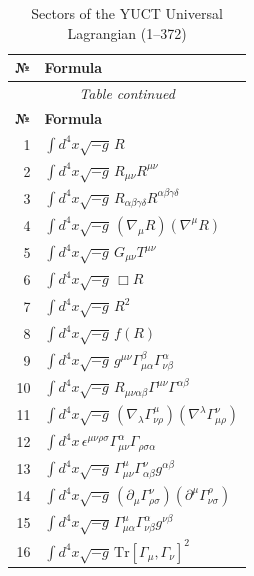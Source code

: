 \documentclass[11pt,a4paper]{article}
\begin{document}
	\scriptsize
\begin{longtable}{r p{}}
	\caption{Sectors of the YUCT Universal Lagrangian (1–372)}\label{tab:sectors-100}\\
	\toprule
	\textbf{№} & \textbf{Formula} \\
	\midrule
	\endfirsthead
	\multicolumn{2}{c}{\textit{Table continued}}\\
	\toprule
	\textbf{№} & \textbf{Formula} \\
	\midrule
	\endhead
	\bottomrule
	\endfoot
	1 & \(\displaystyle \int d^4x\sqrt{-g}\,R\) \\
	2 & \(\displaystyle \int d^4x\sqrt{-g}\,R_{\mu\nu}R^{\mu\nu}\) \\
	3 & \(\displaystyle \int d^4x\sqrt{-g}\,R_{\alpha\beta\gamma\delta}R^{\alpha\beta\gamma\delta}\) \\
	4 & \(\displaystyle \int d^4x\sqrt{-g}\,(\nabla_\mu R)(\nabla^\mu R)\) \\
	5 & \(\displaystyle \int d^4x\sqrt{-g}\,G_{\mu\nu}T^{\mu\nu}\) \\
	6 & \(\displaystyle \int d^4x\sqrt{-g}\,\Box R\) \\
	7 & \(\displaystyle \int d^4x\sqrt{-g}\,R^2\) \\
	8 & \(\displaystyle \int d^4x\sqrt{-g}\,f(R)\) \\
	9 & \(\displaystyle \int d^4x\sqrt{-g}\,g^{\mu\nu}\Gamma^{\beta}_{\mu\alpha}\Gamma^{\alpha}_{\nu\beta}\) \\
	10 & \(\displaystyle \int d^4x\sqrt{-g}\,R_{\mu\nu\alpha\beta}\Gamma^{\mu\nu}\Gamma^{\alpha\beta}\) \\
	11 & \(\displaystyle \int d^4x\sqrt{-g}\,(\nabla_\lambda\Gamma^{\mu}_{\nu\rho})(\nabla^\lambda\Gamma^{\nu}_{\mu\rho})\) \\
	12 & \(\displaystyle \int d^4x\,\epsilon^{\mu\nu\rho\sigma}\Gamma^{\alpha}_{\mu\nu}\Gamma_{\rho\sigma\alpha}\) \\
	13 & \(\displaystyle \int d^4x\sqrt{-g}\,\Gamma^{\mu}_{\mu\nu}\Gamma^{\nu}_{\alpha\beta}g^{\alpha\beta}\) \\
	14 & \(\displaystyle \int d^4x\sqrt{-g}\,(\partial_\mu\Gamma^{\nu}_{\rho\sigma})(\partial^\mu\Gamma^{\rho}_{\nu\sigma})\) \\
	15 & \(\displaystyle \int d^4x\sqrt{-g}\,\Gamma^{\mu}_{\mu\alpha}\Gamma^{\alpha}_{\nu\beta}g^{\nu\beta}\) \\
	16 & \(\displaystyle \int d^4x\sqrt{-g}\,\mathrm{Tr}[\Gamma_\mu,\Gamma_\nu]^2\) \\

\end{longtable}
\end{document}

